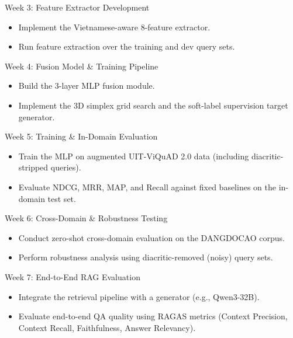 \documentclass[11pt,a4paper]{article}
\begin{document}
\begin{timelinebox}{Week 3: Feature Extractor Development}
\begin{itemize}[leftmargin=*,nosep]
    \item Implement the Vietnamese-aware 8-feature extractor.
    \item Run feature extraction over the training and dev query sets.
\end{itemize}
\end{timelinebox}

\begin{timelinebox}{Week 4: Fusion Model \& Training Pipeline}
\begin{itemize}[leftmargin=*,nosep]
    \item Build the 3-layer MLP fusion module.
    \item Implement the 3D simplex grid search and the soft-label supervision target generator.
\end{itemize}
\end{timelinebox}

\begin{timelinebox}{Week 5: Training \& In-Domain Evaluation}
\begin{itemize}[leftmargin=*,nosep]
    \item Train the MLP on augmented UIT-ViQuAD 2.0 data (including diacritic-stripped queries).
    \item Evaluate NDCG, MRR, MAP, and Recall against fixed baselines on the in-domain test set.
\end{itemize}
\end{timelinebox}

\begin{timelinebox}{Week 6: Cross-Domain \& Robustness Testing}
\begin{itemize}[leftmargin=*,nosep]
    \item Conduct zero-shot cross-domain evaluation on the DANGDOCAO corpus.
    \item Perform robustness analysis using diacritic-removed (noisy) query sets.
\end{itemize}
\end{timelinebox}

\begin{timelinebox}{Week 7: End-to-End RAG Evaluation}
\begin{itemize}[leftmargin=*,nosep]
    \item Integrate the retrieval pipeline with a generator (e.g., Qwen3-32B).
    \item Evaluate end-to-end QA quality using RAGAS metrics (Context Precision, Context Recall, Faithfulness, Answer Relevancy).
\end{itemize}
\end{timelinebox}
\end{document}
